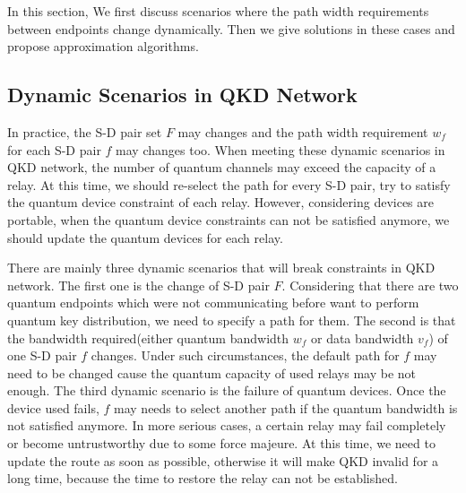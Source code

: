 In this section, We first discuss scenarios where the path width requirements between endpoints change dynamically. Then we give solutions in these cases and propose approximation algorithms.
\subsection{Dynamic Scenarios in QKD Network}
In practice, the S-D pair set $F$ may changes and the path width requirement $w_f$ for each S-D pair $f$ may changes too. When meeting these dynamic scenarios in QKD network, the number of quantum channels may exceed the capacity of a relay. At this time, we should re-select the path for every S-D pair, try to satisfy the quantum device constraint of each relay. However, considering devices are portable, when the quantum device constraints can not be satisfied anymore, we should update the quantum devices for each relay.


There are mainly three dynamic scenarios that will break constraints in QKD network. The first one is the change of S-D pair $F$. Considering that there are two quantum endpoints which were not communicating before want to perform quantum key distribution, we need to specify a path for them. The second is that the bandwidth required(either quantum bandwidth $w_f$ or data bandwidth $v_f$) of one S-D pair $f$ changes. Under such circumstances, the default path for $f$ may need to be changed cause the quantum capacity of used relays may be not enough. The third dynamic scenario is the failure of quantum devices. Once the device used fails, $f$ may needs to select another path if the quantum bandwidth is not satisfied anymore. In more serious cases, a certain relay may fail completely or become untrustworthy due to some force majeure. At this time, we need to update the route as soon as possible, otherwise it will make QKD invalid for a long time, because the time to restore the relay can not be established.



